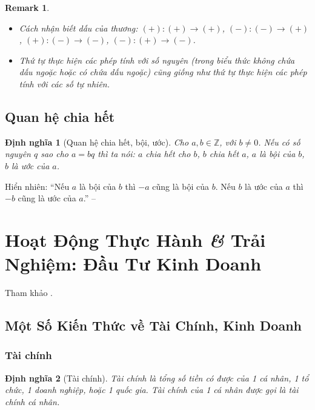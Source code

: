 \documentclass[oneside]{book}
\numberwithin{equation}{section}
\newtheorem{dinhnghia}{Định nghĩa}[section]
\newtheorem{remark}{Remark}[section]
\begin{document}
\begin{remark}
	\begin{itemize}
		\item Cách nhận biết dấu của thương: $(+):(+)\to(+)$, $(-):(-)\to(+)$, $(+):(-)\to(-)$, $(-):(+)\to(-)$.
		\item Thứ tự thực hiện các phép tính với số nguyên (trong biểu thức không chứa dấu ngoặc hoặc có chứa dấu ngoặc) cũng giống như thứ tự thực hiện các phép tính với các số tự nhiên.
	\end{itemize}
\end{remark}

\subsection{Quan hệ chia hết}

\begin{dinhnghia}[Quan hệ chia hết, bội, ước]
	Cho $a,b\in\mathbb{Z}$, với $b\ne 0$. Nếu có số nguyên $q$ sao cho $a = bq$ thì ta nói: $a$ \emph{chia hết cho} $b$, $b$ \emph{chia hết} $a$, $a$ là \emph{bội} của $b$, $b$ là \emph{ước} của $a$.
\end{dinhnghia}
Hiển nhiên: ``Nếu $a$ là bội của $b$ thì $-a$ cũng là bội của $b$. Nếu $b$ là ước của $a$ thì $-b$ cũng là ước của $a$.'' -- \cite[p. 86]{Thai_Anh_Dat_Ha_Loan_Nam_Quang_Toan_6_tap_1}


\section{Hoạt Động Thực Hành \textit{\&} Trải Nghiệm: Đầu Tư Kinh Doanh}
Tham khảo \cite[pp. 89--92]{Thai_Anh_Dat_Ha_Loan_Nam_Quang_Toan_6_tap_1}.

\subsection{Một Số Kiến Thức về Tài Chính, Kinh Doanh}

\subsubsection{Tài chính}
\begin{dinhnghia}[Tài chính]
	\emph{Tài chính} là tổng số tiền có được của 1 cá nhân, 1 tổ chức, 1 doanh nghiệp, hoặc 1 quốc gia. Tài chính của 1 cá nhân được gọi là \emph{tài chính cá nhân}.
\end{dinhnghia}
\end{document}
